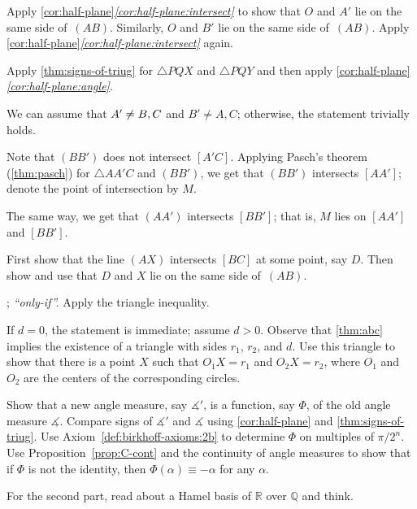 Apply \ref{cor:half-plane}\textit{\ref{cor:half-plane:intersect}} to show that $O$ and $A'$
lie on the same side of~$(AB)$.
Similarly, $O$ and $B'$ lie on the same side of~$(AB)$.
Apply \ref{cor:half-plane}\textit{\ref{cor:half-plane:intersect}} again.

Apply \ref{thm:signs-of-triug} for $\triangle PQX$ and $\triangle PQY$ and then 
apply \ref{cor:half-plane}\textit{\ref{cor:half-plane:angle}}.

We can assume that $A'\z\ne B,C$ and $B'\ne A, C$;
otherwise, the statement trivially holds.

Note that $(BB')$ does not intersect $[A'C]$.
Applying Pasch's theorem (\ref{thm:pasch}) for $\triangle AA'C$ and $(BB')$, we get that 
$(BB')$ intersects $[AA']$; denote the point of intersection by $M$.

Тhe same way, we get that $(AA')$ intersects $[BB']$;
that is, $M$ lies on $[AA']$ and $[BB']$.

First show that the line $(AX)$ intersects $[BC]$ at some point, say $D$.
Then show and use that $D$ and $X$ lie on the same side of~$(AB)$.

\parbf{\ref{ex:intersecting-circles-3}}; \textit{``only-if''.}
Apply the triangle inequality.

If $d=0$, the statement is immediate; assume $d>0$.
Observe that \ref{thm:abc} implies the existence of a triangle with sides $r_1$, $r_2$, and $d$.
Use this triangle to show that there is a point $X$ such that $O_1X=r_1$ and $O_2X=r_2$, where $O_1$ and $O_2$ are the centers of the corresponding circles.

Show that a new angle measure, say $\measuredangle'$, is a function, say $\Phi$, of the old angle measure $\measuredangle$.
Compare signs of $\measuredangle'$ and $\measuredangle$ using \ref{cor:half-plane} and \ref{thm:signs-of-triug}.
Use Axiom~\ref{def:birkhoff-axioms:2b} to determine $\Phi$ on multiples of $\pi/2^n$.
Use Proposition~\ref{prop:C-cont} and the continuity of angle measures to show that if $\Phi$ is not the identity, then $\Phi(\alpha)\equiv -\alpha$ for any $\alpha$.

For the second part, read about a Hamel basis of $\mathbb R$ over $\mathbb Q$ and think.

\setcounter{eqtn}{0}


